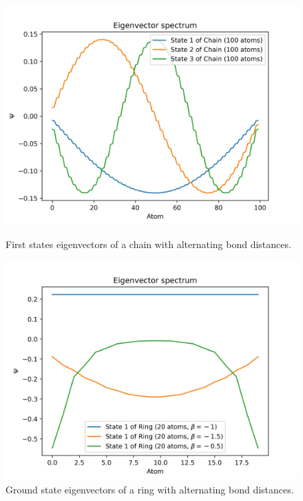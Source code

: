 \documentclass[twocolumn]{article}
\begin{document}
\begin{figure}[ht]
    \centering
    \begin{minipage}{0.47\textwidth}
        \centering
        \includegraphics[width=\textwidth]{Figures/beta_chain_eigenvectors.jpg}
        \caption{First states eigenvectors of a chain with alternating bond distances.}
        \label{fig:chain_alternating_beta_vec}
    \end{minipage}
    \hfill
    \begin{minipage}{0.47\textwidth}
        \centering
        \includegraphics[width=\textwidth]{Figures/ring_beta_eigenvectors.jpg}
        \caption{Ground state eigenvectors of a ring with alternating bond distances.}
        \label{fig:ring_alternating_beta_vec}
    \end{minipage}

\end{figure}
\end{document}
